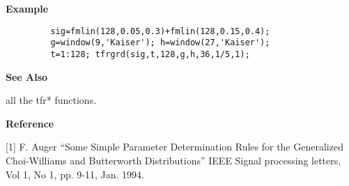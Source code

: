 {\bf \large \sf Example}
\begin{verbatim}
         sig=fmlin(128,0.05,0.3)+fmlin(128,0.15,0.4);  
         g=window(9,'Kaiser'); h=window(27,'Kaiser'); 
         t=1:128; tfrgrd(sig,t,128,g,h,36,1/5,1);
\end{verbatim}
\vspace*{.5cm}

{\bf \large \sf See Also}\\
\hspace*{1.5cm}
\begin{minipage}[t]{13.5cm}
all the {\ty tfr*} functions.
\end{minipage}
\vspace*{.5cm}


{\bf \large \sf Reference}\\
\hspace*{1.5cm}
\begin{minipage}[t]{13.5cm}
[1] F. Auger ``Some Simple Parameter Determination Rules for the
Generalized Choi-Williams and Butterworth Distributions'' IEEE Signal
processing letters, Vol 1, No 1, pp. 9-11, Jan. 1994.

\end{minipage}
